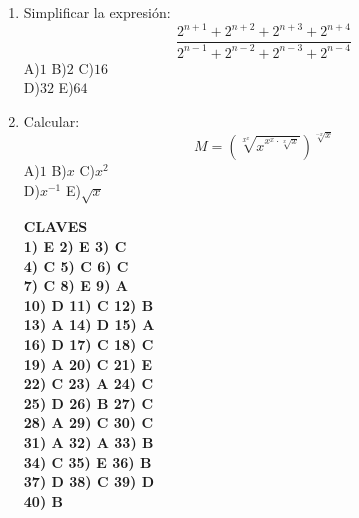 \documentclass[
  10pt,
]{article}
\begin{document}
\begin{enumerate}
  \[E = x^{x^{1 + x^{x + 1}}}
  \]A)\(8\) B)\(64\) C)\(16\)\\
  D)\(4\) E)\(32\)
\item
  Simplificar la expresión:\\
  \[\frac{2^{n + 1} + 2^{n + 2} + 2^{n + 3} + 2^{n + 4}}{2^{n - 1} + 2^{n - 2} + 2^{n - 3} + 2^{n - 4}}
  \]A)\(1\) B)\(2\) C)\(16\)\\
  D)\(32\) E)\(64\)
\item
  Calcular:\\
  \[M = \left( \sqrt[x^{x}]{x^{x^{x} \cdot \sqrt[x]{x}}} \right)^{\sqrt[{- x}]{x}}
  \]A)\(1\) B)\(x\) C)\(x^{2}\)\\
  D)\(x^{- 1}\) E)\(\sqrt{x}\)

  \textbf{CLAVES\\
  1) E 2) E 3) C\\
  4) C 5) C 6) C\\
  7) C 8) E 9) A\\
  10) D 11) C 12) B\\
  13) A 14) D 15) A\\
  16) D 17) C 18) C\\
  19) A 20) C 21) E\\
  22) C 23) A 24) C\\
  25) D 26) B 27) C\\
  28) A 29) C 30) C\\
  31) A 32) A 33) B\\
  34) C 35) E 36) B\\
  37) D 38) C 39) D\\
  40) B}


\end{enumerate}
\end{document}
